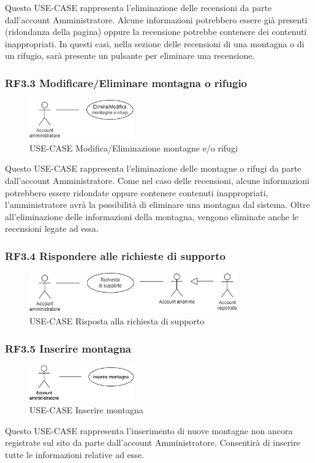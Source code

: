 \documentclass[a4paper,12pt]{article}
\begin{document}
Questo USE-CASE rappresenta l'eliminazione delle recensioni da parte dall'account Amministratore.
Alcune informazioni potrebbero essere già presenti (ridondanza della pagina) oppure la recensione potrebbe contenere dei contenuti inappropriati. 
In questi casi, nella sezione delle recensioni di una montagna o di un rifugio, sarà presente un pulsante per eliminare una recensione.

\subsubsection*{RF3.3 Modificare/Eliminare montagna o rifugio}
\begin{figure}[H]
   \centering
   \includegraphics[width=0.4\textwidth]{img-D2/m_e_montagna_rifugio.png}
    \caption{USE-CASE Modifica/Eliminazione montagne e/o rifugi}
\end{figure}

Questo USE-CASE rappresenta l'eliminazione delle montagne o rifugi da parte dall'account Amministratore.
Come nel caso delle recensioni, alcune informazioni potrebbero essere ridondate oppure contenere contenuti inappropriati, l'amministratore avrà la possibilità di eliminare una montagna dal sistema.
Oltre all'eliminazione delle informazioni della montagna, vengono eliminate anche le recensioni legate ad essa. 

\subsubsection*{RF3.4 Rispondere alle richieste di supporto}

\begin{figure}[H]
   \centering
   \includegraphics[width=0.8\textwidth]{img-D2/richiesta_supporto_amministratore.png}
    \caption{USE-CASE Risposta alla richiesta di supporto}
\end{figure}

\subsubsection*{RF3.5 Inserire montagna}
\begin{figure}[H]
   \centering
   \includegraphics[width=0.4\textwidth]{img-D2/inserire_montagna.png}
    \caption{USE-CASE Inserire montagna}
\end{figure}
Questo USE-CASE rappresenta l'inserimento di nuove montagne non ancora registrate sul sito da parte dall'account Amministratore.
Consentirà di inserire tutte le informazioni relative ad esse.
\end{document}
